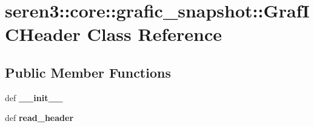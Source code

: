\hypertarget{classseren3_1_1core_1_1grafic__snapshot_1_1GrafICHeader}{
\section{seren3::core::grafic\_\-snapshot::GrafICHeader Class Reference}
\label{classseren3_1_1core_1_1grafic__snapshot_1_1GrafICHeader}
}
\subsection*{Public Member Functions}
\begin{DoxyCompactItemize}
\item 
\hypertarget{classseren3_1_1core_1_1grafic__snapshot_1_1GrafICHeader_abb0ffa819994b11443e7c70f7c7b752b}{
def {\bfseries \_\-\_\-init\_\-\_\-}}
\label{classseren3_1_1core_1_1grafic__snapshot_1_1GrafICHeader_abb0ffa819994b11443e7c70f7c7b752b}

\item 
\hypertarget{classseren3_1_1core_1_1grafic__snapshot_1_1GrafICHeader_af9b14fbc2f2cc92b8bfab0516538cc9b}{
def {\bfseries read\_\-header}}
\label{classseren3_1_1core_1_1grafic__snapshot_1_1GrafICHeader_af9b14fbc2f2cc92b8bfab0516538cc9b}

\end{DoxyCompactItemize}
